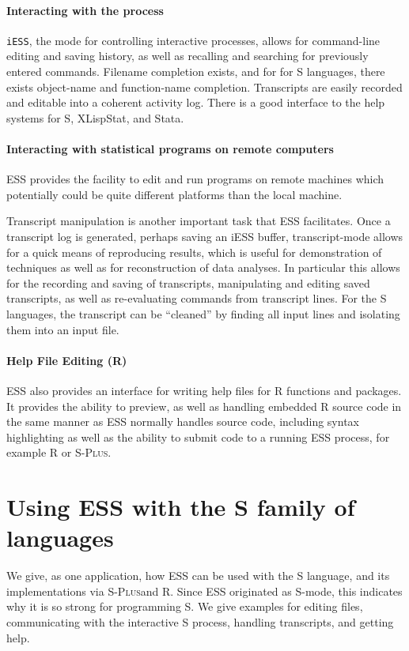 \documentclass{article}
\newcommand*{\Splus}{\textsc{S-Plus}}
\begin{document}
\paragraph{Interacting with the process}
{\tt iESS}, the mode for controlling interactive processes, allows for
command-line editing and saving history, as well as recalling and
searching for previously entered commands.  Filename completion exists,
and for for S languages, there exists object-name and function-name completion.
Transcripts are easily recorded and editable into a coherent activity
log.   There is a good interface to the help systems for S,
XLispStat, and Stata.

\paragraph{Interacting with statistical programs on remote computers}
ESS provides the facility to edit and
run programs on remote machines which potentially could be quite
different platforms than the local machine.

Transcript manipulation is another important task that ESS
facilitates.  Once a transcript log is generated, perhaps saving an
iESS buffer, transcript-mode allows for a quick means of reproducing
results, which is useful for demonstration of techniques as well as
for reconstruction of data analyses.  In particular this allows for
the recording and saving of transcripts, manipulating and editing
saved transcripts, as well as re-evaluating commands from transcript
lines.  For the S languages, the transcript can be ``cleaned'' by
finding all input lines and isolating them into an input file.

\paragraph{Help File Editing (R)}
ESS also provides an interface for writing help files for R functions
and packages.    It provides the ability to preview, as well as
handling embedded R source code in the same manner as ESS normally
handles source code, including syntax highlighting as well as the
ability to submit code to a running ESS process, for example R or
\Splus. 

\section{Using ESS with the S family of languages}
\label{sec:S}

We give, as one application, how ESS can be used with the S language,
and its implementations via \Splus and R.  Since ESS originated as
S-mode, this indicates why it is so strong for programming S.  We give
examples for editing files, communicating with the interactive S
process, handling transcripts, and getting help.
\end{document}
